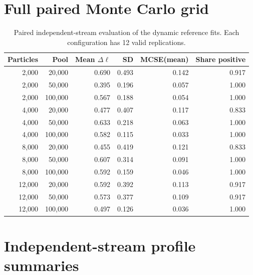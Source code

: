 \documentclass[11pt]{article}
\theoremstyle{definition}
\begin{document}
\section{Full paired Monte Carlo grid}
\label{app:paired-mc}

\begin{table}[H]
\centering
\caption{Paired independent-stream evaluation of the dynamic reference fits. Each configuration has 12 valid replications.}
\label{tab:paired-full}
\small
\begin{tabular}{rrrrrr}
\toprule
Particles & Pool & Mean $\Delta\ell$ & SD & MCSE(mean) & Share positive \\
\midrule
2,000  & 20,000  & 0.690 & 0.493 & 0.142 & 0.917 \\
2,000  & 50,000  & 0.395 & 0.196 & 0.057 & 1.000 \\
2,000  & 100,000 & 0.567 & 0.188 & 0.054 & 1.000 \\
4,000  & 20,000  & 0.477 & 0.407 & 0.117 & 0.833 \\
4,000  & 50,000  & 0.633 & 0.218 & 0.063 & 1.000 \\
4,000  & 100,000 & 0.582 & 0.115 & 0.033 & 1.000 \\
8,000  & 20,000  & 0.455 & 0.419 & 0.121 & 0.833 \\
8,000  & 50,000  & 0.607 & 0.314 & 0.091 & 1.000 \\
8,000  & 100,000 & 0.592 & 0.159 & 0.046 & 1.000 \\
12,000 & 20,000  & 0.592 & 0.392 & 0.113 & 0.917 \\
12,000 & 50,000  & 0.573 & 0.377 & 0.109 & 0.917 \\
12,000 & 100,000 & 0.497 & 0.126 & 0.036 & 1.000 \\
\bottomrule
\end{tabular}
\end{table}

\section{Independent-stream profile summaries}
\label{app:profiles}
\end{document}
